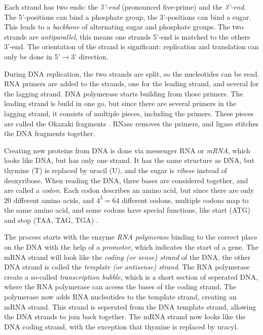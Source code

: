 \documentclass[../main/thesis.tex]{subfiles}
\begin{document}

Each strand has two ends: the \textit{5'-end} (pronounced five-prime) and the \textit{3'-end}.
The 5'-positions can bind a phosphate group, the 3'-positions can bind a sugar.
This leads to a \textit{backbone} of alternating sugar and phosphate groups.
The two strands are \textit{antiparallel}, this means one strands 5'-end is matched to the others 3'-end.
The orientation of the strand is significant: replication and translation can only be done in 5'$\rightarrow$3' direction.


During DNA replication, the two strands are split, so the nucleotides can be read.
RNA primers are added to the strands, one for the leading strand, and several for the lagging strand.
DNA polymerase starts building from those primers.
The leading strand is build in one go, but since there are several primers in the lagging strand, it consists of multiple pieces, including the primers.
These pieces are called the Okazaki fragments \cite{Okazaki_fragments}.
RNase removes the primers, and ligase stitches the DNA fragments together.


Creating new proteins from DNA is done via messenger RNA or \textit{mRNA}, which looks like DNA, but has only one strand.
It has the same structure as DNA, but thymine (T) is replaced by uracil (U), and the sugar is \textit{ribose} instead of deoxyribose.
When reading the DNA, three bases are considered together, and are called a \textit{codon}.
Each codon describes an amino acid, but since there are only 20 different amino acids, and $4^3=64$ different codons, multiple codons map to the same amino acid, and some codons have special functions, like start (ATG) and stop (TAA, TAG, TGA) \cite{codons}.

The process starts with the enzyme \textit{RNA polymerase} binding to the correct place on the DNA with the help of a \textit{promotor}, which indicates the start of a gene.
The mRNA strand will look like the \textit{coding (or sense) strand} of the DNA, the other DNA strand is called the \textit{template (or antisense) strand}.
The RNA polymerase create a so-called \textit{transcription bubble}, which is a short section of seperated DNA, where the RNA polymerase can access the bases of the coding strand.
The polymerase now adds RNA nucleotides to the template strand, creating an mRNA strand.
This strand is seperated from the DNA template strand, allowing the DNA strands to join back together.
The mRNA strand now looks like the DNA coding strand, with the exception that thymine is replaced by uracyl.
\end{document}
